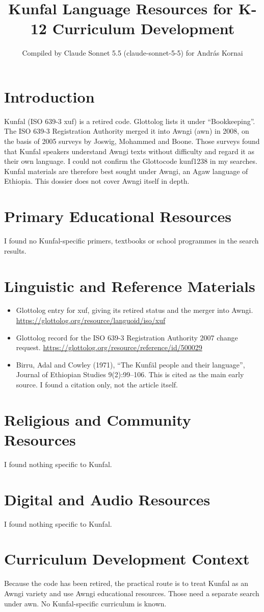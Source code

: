 \documentclass[12pt]{article}
\title{Kunfal Language Resources for K-12 Curriculum Development}
\author{Compiled by Claude Sonnet 5.5 (claude-sonnet-5-5) for Andr\'as Kornai}
\date{}
\begin{document}
\maketitle

\section{Introduction}
Kunfal (ISO 639-3 xuf) is a retired code. Glottolog lists it under ``Bookkeeping''. The ISO 639-3 Registration Authority merged it into Awngi (awn) in 2008, on the basis of 2005 surveys by Joswig, Mohammed and Boone. Those surveys found that Kunfal speakers understand Awngi texts without difficulty and regard it as their own language. I could not confirm the Glottocode kunf1238 in my searches. Kunfal materials are therefore best sought under Awngi, an Agaw language of Ethiopia. This dossier does not cover Awngi itself in depth.

\section{Primary Educational Resources}
I found no Kunfal-specific primers, textbooks or school programmes in the search results.

\section{Linguistic and Reference Materials}
\begin{itemize}
\item Glottolog entry for xuf, giving its retired status and the merger into Awngi. \url{https://glottolog.org/resource/languoid/iso/xuf}
\item Glottolog record for the ISO 639-3 Registration Authority 2007 change request. \url{https://glottolog.org/resource/reference/id/500029}
\item Birru, Adal and Cowley (1971), ``The Kunf\"al people and their language'', Journal of Ethiopian Studies 9(2):99--106. This is cited as the main early source. I found a citation only, not the article itself.
\end{itemize}

\section{Religious and Community Resources}
I found nothing specific to Kunfal.

\section{Digital and Audio Resources}
I found nothing specific to Kunfal.

\section{Curriculum Development Context}
Because the code has been retired, the practical route is to treat Kunfal as an Awngi variety and use Awngi educational resources. Those need a separate search under awn. No Kunfal-specific curriculum is known.
\end{document}

